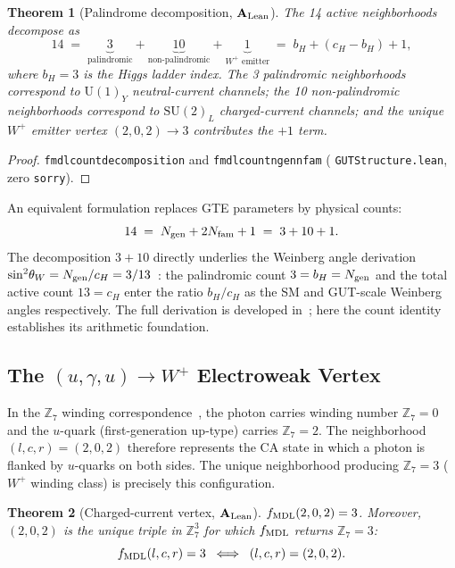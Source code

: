 \documentclass[11pt]{article}
\newtheorem{theorem}{Theorem}[section]
\theoremstyle{remark}
\newcommand{\lean}[1]{%
  \penalty-100
  \begingroup\def\_{\textunderscore\allowbreak}\texttt{#1}\endgroup}
\newcommand{\sinwsq}{\sin^2\!\theta_W}
\newcommand{\CatAL}{\ensuremath{\textbf{A}_{\rm Lean}}}
\begin{document}
\begin{theorem}[Palindrome decomposition, $\CatAL$]\label{thm:palindrome}
The 14 active neighborhoods decompose as
\[
14 \;=\; \underbrace{3}_{\text{palindromic}} + \underbrace{10}_{\text{non-palindromic}} + \underbrace{1}_{W^+\text{ emitter}} \;=\; b_H + (c_H - b_H) + 1,
\]
where $b_H = 3$ is the Higgs ladder index.
The 3 palindromic neighborhoods correspond to $\mathrm{U}(1)_Y$ neutral-current channels;
the 10 non-palindromic neighborhoods correspond to $\mathrm{SU}(2)_L$ charged-current channels;
and the unique $W^+$ emitter vertex $(2,0,2) \to 3$ contributes the $+1$ term.
\end{theorem}

\begin{proof}
\lean{fmdl\_count\_decomposition} and \lean{fmdl\_count\_ngen\_nfam}
(\lean{GUTStructure.lean}, zero \texttt{sorry}).
\end{proof}

An equivalent formulation replaces GTE parameters by physical counts:
\[
14 \;=\; N_{\rm gen} + 2N_{\rm fam} + 1 \;=\; 3 + 10 + 1.
\]
The decomposition $3 + 10$ directly underlies the Weinberg angle derivation
$\sinwsq = N_{\rm gen}/c_H = 3/13$~\cite{SpivackWeinberg}:
the palindromic count $3 = b_H = N_{\rm gen}$ and the total active count
$13 = c_H$ enter the ratio $b_H/c_H$ as the SM and GUT-scale Weinberg angles respectively.
The full derivation is developed in~\cite{SpivackWeinberg}; here the count identity
establishes its arithmetic foundation.

\subsection{The \texorpdfstring{$(u,\gamma,u) \to W^+$}{(u,photon,u)->W+} Electroweak Vertex}
\label{sec:ew_vertex}

In the $\mathbb{Z}_7$ winding correspondence~\cite{Spivack2026_SM_UGP}, the photon
carries winding number $\mathbb{Z}_7 = 0$ and the $u$-quark (first-generation up-type)
carries $\mathbb{Z}_7 = 2$.
The neighborhood $(l, c, r) = (2, 0, 2)$ therefore represents the CA state
in which a photon is flanked by $u$-quarks on both sides.
The unique neighborhood producing $\mathbb{Z}_7 = 3$ ($W^+$ winding class) is precisely
this configuration.

\begin{theorem}[Charged-current vertex, $\CatAL$]\label{thm:cc_vertex}
$f_{\rm MDL}(2, 0, 2) = 3$.
Moreover, $(2, 0, 2)$ is the unique triple in $\mathbb{Z}_7^3$ for which $f_{\rm MDL}$
returns $\mathbb{Z}_7 = 3$:
\[
f_{\rm MDL}(l, c, r) = 3 \;\iff\; (l, c, r) = (2, 0, 2).
\]
\end{theorem}
\end{document}
